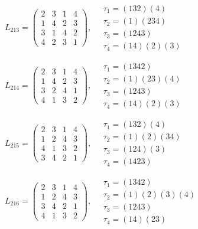 $L_{213} = \begin{pmatrix} 2 & 3 & 1 & 4 \\ 1 & 4 & 2 & 3 \\ 3 & 1 & 4 & 2 \\ 4 & 2 & 3 & 1 \end{pmatrix}, \quad \begin{matrix} \tau_{1} = (1 3 2)(4) \\ \tau_{2} = (1)(2 3 4) \\ \tau_{3} = (1 2 4 3) \\ \tau_{4} = (1 4)(2)(3) \end{matrix}$

$L_{214} = \begin{pmatrix} 2 & 3 & 1 & 4 \\ 1 & 4 & 2 & 3 \\ 3 & 2 & 4 & 1 \\ 4 & 1 & 3 & 2 \end{pmatrix}, \quad \begin{matrix} \tau_{1} = (1 3 4 2) \\ \tau_{2} = (1)(2 3)(4) \\ \tau_{3} = (1 2 4 3) \\ \tau_{4} = (1 4)(2)(3) \end{matrix}$

$L_{215} = \begin{pmatrix} 2 & 3 & 1 & 4 \\ 1 & 2 & 4 & 3 \\ 4 & 1 & 3 & 2 \\ 3 & 4 & 2 & 1 \end{pmatrix}, \quad \begin{matrix} \tau_{1} = (1 3 2)(4) \\ \tau_{2} = (1)(2)(3 4) \\ \tau_{3} = (1 2 4)(3) \\ \tau_{4} = (1 4 2 3) \end{matrix}$

$L_{216} = \begin{pmatrix} 2 & 3 & 1 & 4 \\ 1 & 2 & 4 & 3 \\ 3 & 4 & 2 & 1 \\ 4 & 1 & 3 & 2 \end{pmatrix}, \quad \begin{matrix} \tau_{1} = (1 3 4 2) \\ \tau_{2} = (1)(2)(3)(4) \\ \tau_{3} = (1 2 4 3) \\ \tau_{4} = (1 4)(2 3) \end{matrix}$


